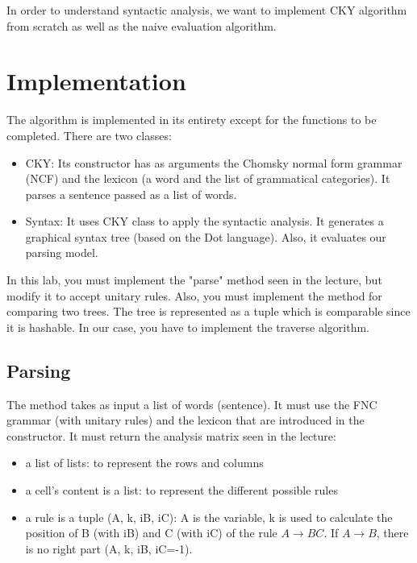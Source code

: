 \documentclass{../../../extra/aakpract/aakpract}
\begin{document}
\maketitle

\begin{center}
	\begin{minipage}{0.8\textwidth}
		\small
		In order to understand syntactic analysis, we want to implement CKY algorithm from scratch as well as the naive evaluation algorithm.
	\end{minipage}
\end{center}

\section{Implementation}

The algorithm is implemented in its entirety except for the functions to be completed.
There are two classes:
\begin{itemize}
	\item CKY: Its constructor has as arguments the Chomsky normal form grammar (NCF) and the lexicon (a word and the list of grammatical categories).
	It parses a sentence passed as a list of words.
	\item Syntax: It uses CKY class to apply the syntactic analysis.
	It generates a graphical syntax tree (based on the Dot language).
	Also, it evaluates our parsing model.
\end{itemize}

In this lab, you must implement the "parse" method seen in the lecture, but modify it to accept unitary rules.
Also, you must implement the method for comparing two trees.
{\color{red} The tree is represented as a tuple which is comparable since it is hashable. In our case, you have to implement the traverse algorithm.}

\subsection{Parsing}

The method takes as input a list of words (sentence).
It must use the FNC grammar (with unitary rules) and the lexicon that are introduced in the constructor.
It must return the analysis matrix seen in the lecture:
\begin{itemize}
	\item a list of lists: to represent the rows and columns
	\item a cell's content is a list: to represent the different possible rules
	\item a rule is a tuple (A, k, iB, iC): A is the variable, k is used to calculate the position of B (with iB) and C (with iC) of the rule $A \rightarrow B C$.
	If $A \rightarrow B$, there is no right part (A, k, iB, iC=-1).
\end{itemize}
\end{document}
